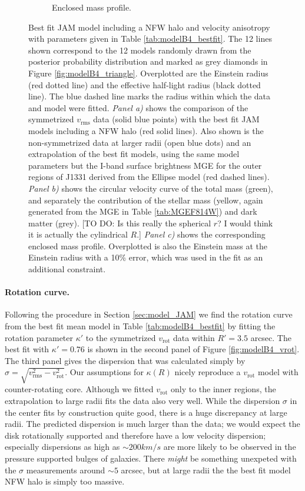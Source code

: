 \begin{figure}
\begin{subfigure}{.48\textwidth}
  \caption{Enclosed mass profile.}
  \label{fig:modelB4_enclMass}
\end{subfigure}
\caption{Best fit JAM model including a NFW halo and velocity anisotropy with parameters given in Table \ref{tab:modelB4_bestfit}. The 12 lines shown correspond to the 12 models randomly drawn from the posterior probability distribution and marked as grey diamonds in Figure \ref{fig:modelB4_triangle}. Overplotted are the Einstein radius (red dotted line) and the effective half-light radius (black dotted line). The blue dashed line marks the radius within which the data and model were fitted. \emph{Panel a)} shows the comparison of the symmetrized $v_\text{rms}$ data (solid blue points) with the best fit JAM models including a NFW halo (red solid lines). Also shown is the non-symmetrized data at larger radii (open blue dots) and an extrapolation of the best fit models, using the same model parameters but the I-band surface brightness MGE for the outer regions of J1331 derived from the Ellipse model (red dashed lines). \emph{Panel b)} shows the circular velocity curve of the total mass (green), and separately the contribution of the stellar mass (yellow, again generated from the MGE in Table \ref{tab:MGEF814W}) and dark matter (grey). [TO DO: Is this really the spherical $r$? I would think it is actually the cylindrical $R$.] \emph{Panel c)} shows the corresponding enclosed mass profile. Overplotted is also the Einstein mass at the Einstein radius with a 10\% error, which was used in the fit as an additional constraint.}
\label{fig:modelB4_models}
\end{figure}



\paragraph{Rotation curve.} Following the procedure in Section \ref{sec:model_JAM} we find the rotation curve from the best fit mean model in Table \ref{tab:modelB4_bestfit} by fitting the rotation parameter $\kappa'$ to the symmetrized $v_\text{rot}$ data within $R' = 3.5$ arcsec. The best fit with $\kappa' = 0.76$ is shown in the second panel of Figure \ref{fig:modelB4_vrot}. The third panel gives the dispersion that was calculated simply by $\sigma = \sqrt{v_\text{rms}^2 - v_\text{rot}^2}$. Our assumptions for $\kappa(R)$ nicely reproduce a $v_\text{rot}$ model with counter-rotating core. Although we fitted $v_\text{rot}$ only to the inner regions, the extrapolation to large radii fits the data also very well. While the dispersion $\sigma$ in the center fits by construction quite good, there is a huge discrepancy at large radii. The predicted dispersion is much larger than the data; we would expect the disk rotationally supported and therefore have a low velocity dispersion; especially dispersions as high as $\sim 200 km/s$ are more likely to be observed in the pressure supported bulges of galaxies. There \emph{might} be something unexpeted with the $\sigma$ measurements around $\sim 5$ arcsec, but at large radii the the best fit model NFW halo is simply too massive. 

